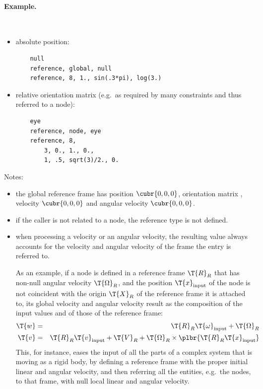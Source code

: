 \paragraph{Example.} \
\begin{itemize}
    \item absolute position:
    \begin{verbatim}
    null
    reference, global, null
    reference, 8, 1., sin(.3*pi), log(3.)
    \end{verbatim}
    \item relative orientation matrix (e.g.\ as required by many constraints and
    thus referred to a node):
    \begin{verbatim}
    eye
    reference, node, eye
    reference, 8,
        3, 0., 1., 0., 
        1, .5, sqrt(3)/2., 0.
    \end{verbatim}
\end{itemize}
Notes: 
\begin{itemize}
    \item the global reference frame has position $ \cubr{0, 0, 0} $,
    orientation matrix \kw{eye}, velocity $ \cubr{0, 0, 0} $ and angular
    velocity $ \cubr{0, 0, 0} $.
    \item if the caller is not related to a node, the reference type
    \kw{node} is not defined. 
    \item when processing a velocity or an angular velocity, the resulting
    value always accounts for the velocity and angular velocity of the frame
    the entry is referred to. 

    As an example, if a node is defined in a reference frame $\T{R}_R$
    that has non-null angular velocity $ \T{\Omega}_R $, and the position 
    $ \T{x}_{\text{input}} $ of the node is not coincident
    with the origin $ \T{X}_R $ of the reference frame
    it is attached to, its global velocity and angular velocity result
    as the composition of the input values and of those of the reference 
    frame:
    \begin{eqnarray*}    
        \T{w} & = & \T{R}_R \T{\omega}_{\text{input}} + \T{\Omega}_R \\
	\T{v} & = & \T{R}_R \T{v}_{\text{input}} + \T{V}_R
		+\T{\Omega}_R\times\plbr{\T{R}_R \T{x}_{\text{input}}}
    \end{eqnarray*}
    This, for instance, eases the input of all the parts of a complex system
    that is moving as a rigid body, by defining a reference frame with the
    proper initial linear and angular velocity, and then referring all the entities, e.g.\ the 
    nodes, to that frame, with null local linear and angular velocity.
\end{itemize}  
